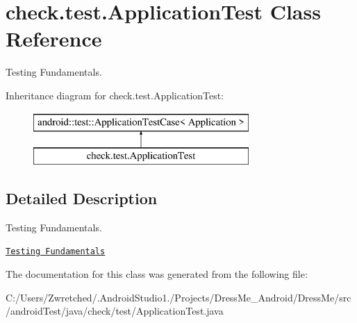 \hypertarget{classcheck_1_1test_1_1_application_test}{}\section{check.\+test.\+Application\+Test Class Reference}
\label{classcheck_1_1test_1_1_application_test}


Testing Fundamentals.  


Inheritance diagram for check.\+test.\+Application\+Test\+:\begin{figure}[H]
\begin{center}
\leavevmode
\includegraphics[height=2.000000cm]{classcheck_1_1test_1_1_application_test}
\end{center}
\end{figure}


\subsection{Detailed Description}
Testing Fundamentals. 

\href{http://d.android.com/tools/testing/testing_android.html}{\tt Testing Fundamentals} 

The documentation for this class was generated from the following file\+:\begin{DoxyCompactItemize}
\item 
C\+:/\+Users/\+Zwretched/.\+Android\+Studio1./\+Projects/\+Dress\+Me\+\_\+\+Android/\+Dress\+Me/src/android\+Test/java/check/test/Application\+Test.\+java\end{DoxyCompactItemize}

